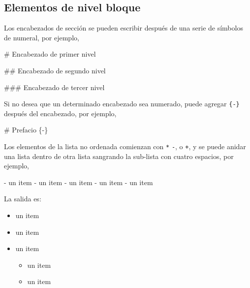 \documentclass[12pt,]{krantz}
\makeatletter
\newenvironment{Shaded}{\begin{snugshade}}{\end{snugshade}}
\newcommand{\FloatTok}[1]{\textcolor[rgb]{0.00,0.00,0.81}{{#1}}}
\newcommand{\FunctionTok}[1]{\textcolor[rgb]{0.00,0.00,0.00}{{#1}}}
\newcommand{\NormalTok}[1]{{#1}}
\providecommand{\tightlist}{%
  \setlength{\itemsep}{0pt}\setlength{\parskip}{0pt}}
\newenvironment{kframe}{%
\medskip{}
\setlength{\fboxsep}{.8em}
 \def\at@end@of@kframe{}%
 \ifinner\ifhmode%
  \def\at@end@of@kframe{\end{minipage}}%
  \begin{minipage}{\columnwidth}%
 \fi\fi%
 \def\FrameCommand##1{\hskip\@totalleftmargin \hskip-\fboxsep
 \colorbox{shadecolor}{##1}\hskip-\fboxsep
     \hskip-\linewidth \hskip-\@totalleftmargin \hskip\columnwidth}%
 \MakeFramed {\advance\hsize-\width
   \@totalleftmargin\z@ \linewidth\hsize
   \@setminipage}}%
 {\par\unskip\endMakeFramed%
 \at@end@of@kframe}
\renewenvironment{Shaded}{\begin{kframe}}{\end{kframe}}
\theoremstyle{definition}
\theoremstyle{definition}
\theoremstyle{remark}
\makeatother
\begin{document}
\subsection{Elementos de nivel bloque}\label{elementos-de-nivel-bloque}

Los encabezados de sección se pueden escribir después de una serie de
símbolos de numeral, por ejemplo,

\begin{Shaded}
\begin{Highlighting}[]
\FunctionTok{# Encabezado de primer nivel}

\FunctionTok{## Encabezado de segundo nivel}

\FunctionTok{### Encabezado de tercer nivel}
\end{Highlighting}
\end{Shaded}

Si no desea que un determinado encabezado sea numerado, puede agregar
\texttt{\{-\}} después del encabezado, por ejemplo,

\begin{Shaded}
\begin{Highlighting}[]
\FunctionTok{# Prefacio \{-\}}
\end{Highlighting}
\end{Shaded}

Los elementos de la lista no ordenada comienzan con \texttt{*}
\texttt{-}, o \texttt{+}, y se puede anidar una lista dentro de otra
lista sangrando la sub-lista con cuatro espacios, por ejemplo,

\begin{Shaded}
\begin{Highlighting}[]
\NormalTok{- }\FloatTok{un item}
\FloatTok{- un item}
\FloatTok{- un item}
\FloatTok{    - un item}
\FloatTok{    - un item}
\end{Highlighting}
\end{Shaded}

La salida es:

\begin{itemize}
\tightlist
\item
  un item
\item
  un item
\item
  un item

  \begin{itemize}
  \tightlist
  \item
    un item
  \item
    un item
  \end{itemize}
\end{itemize}
\end{document}
